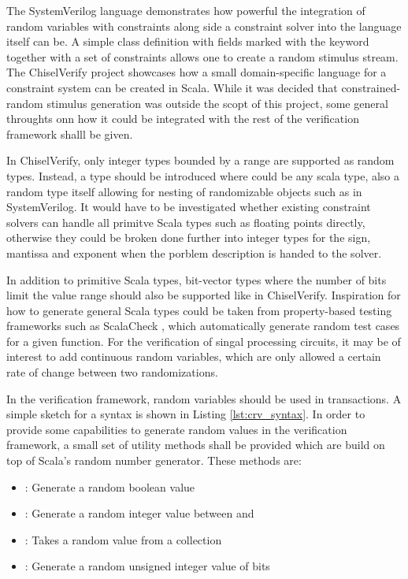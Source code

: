 The SystemVerilog language demonstrates how powerful the integration of random variables with constraints along side
a constraint solver into the language itself can be. A simple class definition with fields marked with the 
keyword together with a set of constraints allows one to create a random stimulus stream. The ChiselVerify project showcases how a small domain-specific language for a
constraint system can be created in Scala. While it was decided that constrained-random stimulus generation was outside the scopt of this project, some general throughts onn how it could be integrated with the rest of the verification framework shalll be given. 

In ChiselVerify, only integer types bounded by a range are supported as random types. Instead, a  type
should be introduced where  could be any scala type, also a random type itself allowing for nesting of
randomizable objects such as in SystemVerilog. It would have to be investigated whether existing constraint solvers
can handle all primitve Scala types such as floating points directly, otherwise they could be broken done further
into integer types for the sign, mantissa and exponent when the porblem description is handed to the solver.

In addition to primitive Scala types, bit-vector types where the number of bits limit the value range should also be
supported like in ChiselVerify. Inspiration for how to generate general Scala types could be taken from
property-based testing frameworks such as ScalaCheck \cite{scalacheck}, which automatically generate random test
cases for a given function. For the verification of singal processing circuits, it may be of interest to add
continuous random variables, which are only allowed a certain rate of change between two randomizations.

In the verification framework, random variables should be used in transactions. A simple sketch for a syntax is shown
in Listing \ref{lst:crv_syntax}. In order to provide some capabilities to generate random values in the verification framework, a small set of utility methods shall be provided which are build on top of Scala's random number generator. These methods are:  

\begin{itemize}
  \item {}: Generate a random boolean value
  \item {}: Generate a random integer value between  and 
  \item {}: Takes a random value from a collection
  \item {}: Generate a random unsigned integer value of  bits
\end{itemize}



